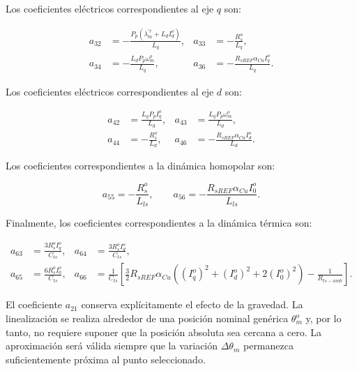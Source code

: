 \documentclass[10pt,a4paper]{article}
\begin{document}
Los coeficientes eléctricos correspondientes al eje $q$ son:

\begin{equation}
	\begin{aligned}
		a_{32}
		&=
		-\frac{
			P_p\left(\lambda_m^{\prime r}+L_dI_d^o\right)
		}{L_q},
		&
		a_{33}
		&=
		-\frac{R_s^o}{L_q},\\[1mm]
		a_{34}
		&=
		-\frac{L_dP_p\omega_m^o}{L_q},
		&
		a_{36}
		&=
		-\frac{
			R_{sREF}\alpha_{Cu}I_q^o
		}{L_q}.
	\end{aligned}
	\label{eq:coeficientes_q_lpv_6}
\end{equation}

Los coeficientes eléctricos correspondientes al eje $d$ son:

\begin{equation}
	\begin{aligned}
		a_{42}
		&=
		\frac{L_qP_pI_q^o}{L_d},
		&
		a_{43}
		&=
		\frac{L_qP_p\omega_m^o}{L_d},\\[1mm]
		a_{44}
		&=
		-\frac{R_s^o}{L_d},
		&
		a_{46}
		&=
		-\frac{
			R_{sREF}\alpha_{Cu}I_d^o
		}{L_d}.
	\end{aligned}
	\label{eq:coeficientes_d_lpv_6}
\end{equation}

Los coeficientes correspondientes a la dinámica homopolar son:

\begin{equation}
	a_{55}
	=
	-\frac{R_s^o}{L_{ls}},
	\qquad
	a_{56}
	=
	-\frac{
		R_{sREF}\alpha_{Cu}I_0^o
	}{L_{ls}}.
	\label{eq:coeficientes_0_lpv_6}
\end{equation}

Finalmente, los coeficientes correspondientes a la dinámica térmica son:

\begin{equation}
	\begin{aligned}
		a_{63}
		&=
		\frac{3R_s^oI_q^o}{C_{ts}},
		&
		a_{64}
		&=
		\frac{3R_s^oI_d^o}{C_{ts}},\\[1mm]
		a_{65}
		&=
		\frac{6R_s^oI_0^o}{C_{ts}},
		&
		a_{66}
		&=
		\frac{1}{C_{ts}}
		\left[
		\frac{3}{2}
		R_{sREF}\alpha_{Cu}
		\left(
		(I_q^o)^2
		+(I_d^o)^2
		+2(I_0^o)^2
		\right)
		-\frac{1}{R_{ts-amb}}
		\right].
	\end{aligned}
	\label{eq:coeficientes_termicos_lpv_6}
\end{equation}

El coeficiente $a_{21}$ conserva explícitamente el efecto de la gravedad. La linealización se realiza alrededor de una posición nominal genérica $\theta_m^o$ y, por lo tanto, no requiere suponer que la posición absoluta sea cercana a cero. La aproximación será válida siempre que la variación $\Delta\theta_m$ permanezca suficientemente próxima al punto seleccionado.
\end{document}
